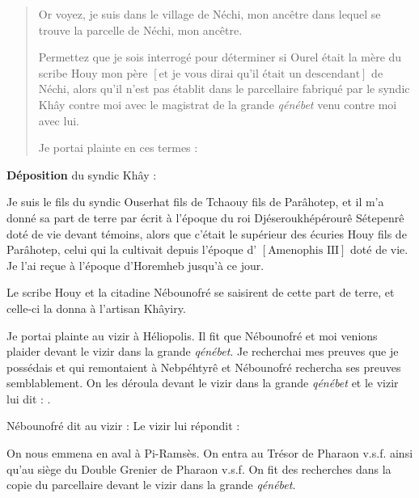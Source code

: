 \documentclass[%
  hiero, %
  background, %
  dvipsnames, %
  svgnames, %
  a4paper, %
  twoside, %
  openany, %
  10pt, %
  article, %
  oldfontcommands %
]{nefermemoir}
\newcommand{\lacune}[1][\dots]{%
  \ensuremath{%
    \left[\text{#1}\right]%
  }\xspace%
}
\begin{document}
\begin{quote}
{  Or voyez, je suis dans le village de Néchi, mon ancêtre dans lequel se trouve la parcelle de Néchi, mon ancêtre.

  Permettez que je sois interrogé pour déterminer si Ourel était la mère du scribe Houy mon père \lacune[et je vous dirai qu'il était un descendant] de Néchi, alors qu'il  n'est pas établit dans le parcellaire fabriqué par le syndic Khây contre moi avec le magistrat de la grande \emph{qénébet} venu contre moi avec lui.

  Je portai plainte en ces termes : 
}%
\end{quote}

\textbf{Déposition} du syndic Khây :

Je suis le fils du syndic Ouserhat fils de Tchaouy fils de Parâhotep, et il m'a donné sa part de terre par écrit à l'époque du roi Djéseroukhépérourê Sétepenrê doté de vie devant témoins, alors que c'était le supérieur des écuries Houy fils de Parâhotep, celui qui la cultivait depuis l'époque d'\lacune[Amenophis~III]  doté de vie. Je l'ai reçue à l'époque d'Horemheb jusqu'à ce jour.

Le scribe Houy et la citadine Nébounofré se saisirent de cette part de terre, et celle-ci la donna à l'artisan Khâyiry.

Je portai plainte au vizir à Héliopolis. Il fit que Nébounofré et moi venions plaider devant le vizir dans la grande \emph{qénébet}.
Je recherchai mes preuves que je possédais et qui remontaient à Nebpéhtyrê et Nébounofré rechercha ses preuves semblablement.
On les déroula devant le vizir dans la grande \emph{qénébet} et le vizir lui dit : .

Nébounofré dit au vizir :  Le vizir lui répondit : 

On nous emmena en aval à Pi-Ramsès. On entra au Trésor de Pharaon v.s.f. ainsi qu'au siège du Double Grenier de Pharaon v.s.f.
On fit des recherches dans la copie du parcellaire devant le vizir dans la grande \emph{qénébet}.
\end{document}
